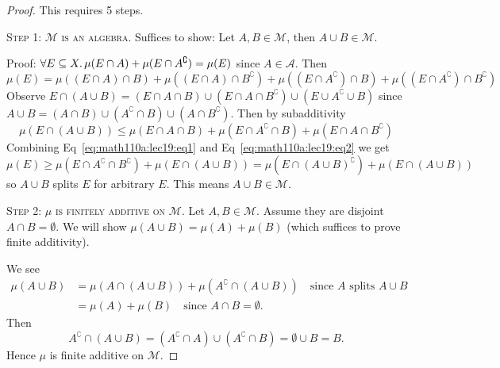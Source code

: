 \begin{proof}
This requires 5 steps.

\textsc{Step 1: $\mathcal{M}$ is an algebra.}
Suffices to show: Let $A,B\in\mathcal{M}$, then $A\cup B\in\mathcal{M}$.

Proof: $\forall E\subset X\ldotp\mu(E\cap A)+\mu(E\cap A^{\complement})=\mu(E)$
since $A\in\mathcal{A}$. Then
\begin{equation}\label{eq:math110a:lec19:eq1}
\mu(E)=\mu((E\cap A)\cap B)+\mu((E\cap A)\cap B^{\complement})
+ \mu((E\cap A^{\complement})\cap B)+\mu((E\cap A^{\complement})\cap B^{\complement})
\end{equation}
Observe $E\cap(A\cup B)=(E\cap A\cap B)\cup(E\cap A\cap B^{\complement})\cup(E\cup A^{\complement}\cup B)$
since $A\cup B=(A\cap B)\cup(A^{\complement}\cap B)\cup(A\cap B^{\complement})$.
Then by subadditivity
\begin{equation}\label{eq:math110a:lec19:eq2}
\mu(E\cap(A\cup B))\leq\mu(E\cap A\cap B)+\mu(E\cap
A^{\complement}\cap B) + \mu(E\cap A\cap B^{\complement})
\end{equation}
Combining Eq~\eqref{eq:math110a:lec19:eq1} and Eq~\eqref{eq:math110a:lec19:eq2}
we get
\begin{equation}
\mu(E)\geq\mu(E\cap A^{\complement}\cap
B^{\complement})+\mu(E\cap(A\cup B))=\mu(E\cap(A\cup B)^{\complement})+\mu(E\cap(A\cup B))
\end{equation}
so $A\cup B$ splits $E$ for arbitrary $E$. This means $A\cup B\in\mathcal{M}$.

\textsc{Step 2: $\mu$ is finitely additive on $\mathcal{M}$.}
Let $A,B\in\mathcal{M}$. Assume they are disjoint $A\cap B=\emptyset$.
We will show $\mu(A\cup B)=\mu(A)+\mu(B)$ (which suffices to prove
finite additivity).

We see
\begin{subequations}
  \begin{align}
\mu(A\cup B)
&=\mu(A\cap(A\cup B))+\mu(A^{\complement}\cap(A\cup
B))\quad\mbox{since $A$ splits $A\cup B$}\\
&=\mu(A)+\mu(B)\quad\mbox{since $A\cap B=\emptyset$}.
  \end{align}
\end{subequations}
Then
\begin{equation}
A^{\complement}\cap(A\cup B)=(A^{\complement}\cap
A)\cup(A^{\complement}\cap B)=\emptyset\cup B=B.
\end{equation}
Hence $\mu$ is finite additive on $\mathcal{M}$.


\end{proof}
